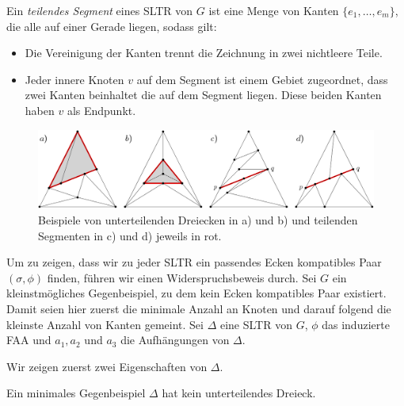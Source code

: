 \begin{definition}
Ein \textit{teilendes Segment} eines SLTR von $G$ ist eine Menge von Kanten $\{e_1, \ldots , e_m\}$, die alle auf einer Gerade liegen, sodass gilt:
\begin{itemize}
\item Die Vereinigung der Kanten trennt die Zeichnung in zwei nichtleere Teile. 
\item Jeder innere Knoten $v$ auf dem Segment ist einem Gebiet zugeordnet, dass zwei Kanten beinhaltet die auf dem Segment liegen. Diese beiden Kanten haben $v$ als Endpunkt.
\end{itemize}
\end{definition}

\begin{figure}[h]
	\centering
	  \includegraphics[width=1\textwidth]{subdividing_ex.png}
    	\caption{Beispiele von unterteilenden Dreiecken in a) und b) und teilenden Segmenten in c) und d) jeweils in rot.}
    	\label{subdividing_ex}
\end{figure}

Um zu zeigen, dass wir zu jeder SLTR ein passendes Ecken kompatibles Paar $(\sigma,\phi)$ finden, führen wir einen Widerspruchsbeweis durch. Sei $G$ ein kleinstmögliches Gegenbeispiel, zu dem kein Ecken kompatibles Paar existiert. Damit seien hier zuerst die minimale Anzahl an Knoten und darauf folgend die kleinste Anzahl von Kanten gemeint. Sei $\Delta$ eine SLTR von $G$, $\phi$ das induzierte FAA und $a_1,a_2$ und $a_3$ die Aufhängungen von $\Delta$.

Wir zeigen zuerst zwei Eigenschaften von $\Delta$.

\begin{lemma}\label{lem2}
Ein minimales Gegenbeispiel $\Delta$ hat kein unterteilendes Dreieck.
\end{lemma}

